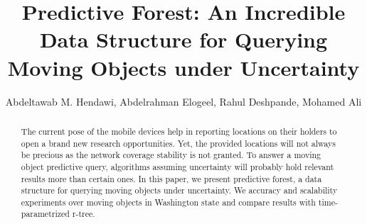 \documentclass{IEEEtran}
\newcommand{\pf}{predictive forest\xspace}
\newcommand{\tpr}{time-parametrized r-tree}
\begin{document}
%
%
%

\title{Predictive Forest: An Incredible Data Structure for Querying Moving Objects under Uncertainty}

\author{
{Abdeltawab M. Hendawi, Abdelrahman Elogeel, Rahul Deshpande, Mohamed Ali}
}

\maketitle

\begin{abstract}
The current pose of the mobile devices help in reporting locations on their holders to open a brand new research opportunities. Yet, the provided locations will not always be precious as the network coverage stability is not granted. To answer a moving object predictive query, algorithms assuming uncertainty will probably hold relevant results more than certain ones. In this paper, we present \pf, a data structure for querying moving objects under uncertainty. We accuracy and scalability experiments over moving objects in Washington state and compare results with \tpr.
\end{abstract}













\end{document}
